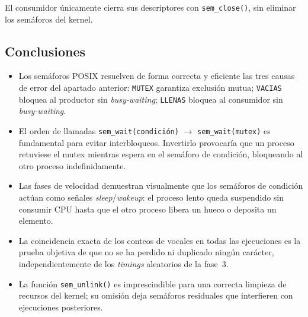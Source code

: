 \documentclass[a4paper, 12pt]{article}
\newcommand{\ic}[1]{\texttt{#1}}
\begin{document}
El consumidor únicamente cierra sus descriptores con \ic{sem\_close()},
sin eliminar los semáforos del kernel.

\subsection{Conclusiones}

\begin{itemize}
  \item Los semáforos POSIX resuelven de forma correcta y eficiente las
        tres causas de error del apartado anterior: \ic{MUTEX} garantiza
        exclusión mutua; \ic{VACIAS} bloquea al productor sin
        \emph{busy-waiting}; \ic{LLENAS} bloquea al consumidor sin
        \emph{busy-waiting}.
  \item El orden de llamadas \ic{sem\_wait(condición)} $\to$
        \ic{sem\_wait(mutex)} es fundamental para evitar interbloqueos.
        Invertirlo provocaría que un proceso retuviese el mutex mientras
        espera en el semáforo de condición, bloqueando al otro proceso
        indefinidamente.
  \item Las fases de velocidad demuestran visualmente que los semáforos
        de condición actúan como señales \emph{sleep}/\emph{wakeup}: el
        proceso lento queda suspendido sin consumir CPU hasta que el otro
        proceso libera un hueco o deposita un elemento.
  \item La coincidencia exacta de los conteos de vocales en todas las
        ejecuciones es la prueba objetiva de que no se ha perdido ni
        duplicado ningún carácter, independientemente de los
        \emph{timings} aleatorios de la fase~3.
  \item La función \ic{sem\_unlink()} es imprescindible para una
        correcta limpieza de recursos del kernel; su omisión deja
        semáforos residuales que interfieren con ejecuciones posteriores.
\end{itemize}
\end{document}
